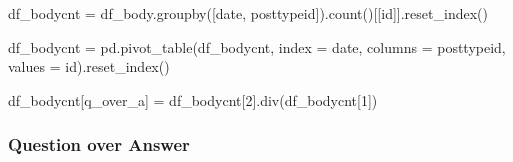 \documentclass[
  letterpaper,
  DIV=11,
  numbers=noendperiod]{scrartcl}
\newenvironment{Shaded}{\begin{snugshade}}{\end{snugshade}}
\newcommand{\NormalTok}[1]{\textcolor[rgb]{0.00,0.23,0.31}{#1}}
\newcommand{\OperatorTok}[1]{\textcolor[rgb]{0.37,0.37,0.37}{#1}}
\newcommand{\StringTok}[1]{\textcolor[rgb]{0.13,0.47,0.30}{#1}}
\begin{document}
\begin{Shaded}
\begin{Highlighting}[]
\NormalTok{df\_bodycnt }\OperatorTok{=}\NormalTok{ df\_body.groupby([}\StringTok{\textquotesingle{}date\textquotesingle{}}\NormalTok{, }\StringTok{\textquotesingle{}posttypeid\textquotesingle{}}\NormalTok{]).count()[[}\StringTok{\textquotesingle{}id\textquotesingle{}}\NormalTok{]].reset\_index()}
\end{Highlighting}
\end{Shaded}

\begin{Shaded}
\begin{Highlighting}[]
\NormalTok{df\_bodycnt }\OperatorTok{=}\NormalTok{ pd.pivot\_table(df\_bodycnt, index }\OperatorTok{=} \StringTok{\textquotesingle{}date\textquotesingle{}}\NormalTok{, columns }\OperatorTok{=} \StringTok{\textquotesingle{}posttypeid\textquotesingle{}}\NormalTok{, values }\OperatorTok{=} \StringTok{\textquotesingle{}id\textquotesingle{}}\NormalTok{).reset\_index()}
\end{Highlighting}
\end{Shaded}

\begin{Shaded}
\begin{Highlighting}[]
\NormalTok{df\_bodycnt[}\StringTok{\textquotesingle{}q\_over\_a\textquotesingle{}}\NormalTok{] }\OperatorTok{=}\NormalTok{ df\_bodycnt[}\StringTok{\textquotesingle{}2\textquotesingle{}}\NormalTok{].div(df\_bodycnt[}\StringTok{\textquotesingle{}1\textquotesingle{}}\NormalTok{])}
\end{Highlighting}
\end{Shaded}

\subsubsection{Question over Answer}\label{question-over-answer}
\end{document}
